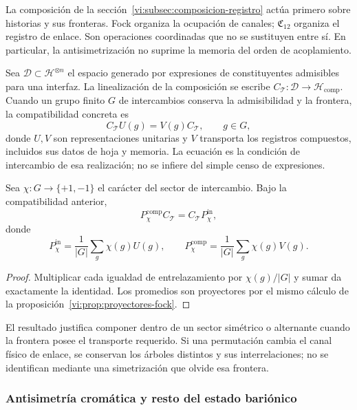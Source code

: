 La composición de la sección~\ref{vi:subsec:composicion-registro}
actúa primero sobre historias y sus fronteras. Fock organiza
la ocupación de canales; \(\mathfrak C_{12}\) organiza el
registro de enlace. Son operaciones coordinadas que no se
sustituyen entre sí. En particular, la antisimetrización no
suprime la memoria del orden de acoplamiento.

Sea \(\mathcal D\subset\mathcal H^{\otimes n}\) el espacio
generado por expresiones de constituyentes admisibles para una
interfaz. La linealización de la composición se escribe
\(C_{\mathcal T}:\mathcal D\to\mathcal H_{\mathrm{comp}}\).
Cuando un grupo finito \(G\) de intercambios conserva la
admisibilidad y la frontera, la compatibilidad concreta es
\[
 C_{\mathcal T}U(g)=V(g)C_{\mathcal T},\qquad g\in G,
\]
donde \(U,V\) son representaciones unitarias y \(V\) transporta
los registros compuestos, incluidos sus datos de hoja y memoria.
La ecuación es la condición de
intercambio de esa realización; no se infiere del simple
censo de expresiones.

\begin{proposition}
\label{vi:prop:composicion-estadistica}
Sea \(\chi:G\to\{+1,-1\}\) el carácter del sector de
intercambio. Bajo la compatibilidad anterior,
\[
 P_\chi^{\mathrm{comp}}C_{\mathcal T}
 =C_{\mathcal T}P_\chi^{\mathrm{in}},
\]
donde
\[
 P_\chi^{\mathrm{in}}=\frac1{|G|}\sum_g\chi(g)U(g),
 \qquad
 P_\chi^{\mathrm{comp}}=\frac1{|G|}\sum_g\chi(g)V(g).
\]
\end{proposition}
\begin{proof}
Multiplicar cada igualdad de entrelazamiento por
\(\chi(g)/|G|\) y sumar da exactamente la identidad.
Los promedios son proyectores por el mismo cálculo de
la proposición~\ref{vi:prop:proyectores-fock}.
\end{proof}

El resultado justifica componer dentro de un sector simétrico
o alternante cuando la frontera posee el transporte requerido.
Si una permutación cambia el canal físico de enlace, se
conservan los árboles distintos y sus interrelaciones; no se
identifican mediante una simetrización que olvide esa frontera.

\subsubsection{Antisimetría cromática y resto del estado bariónico}

